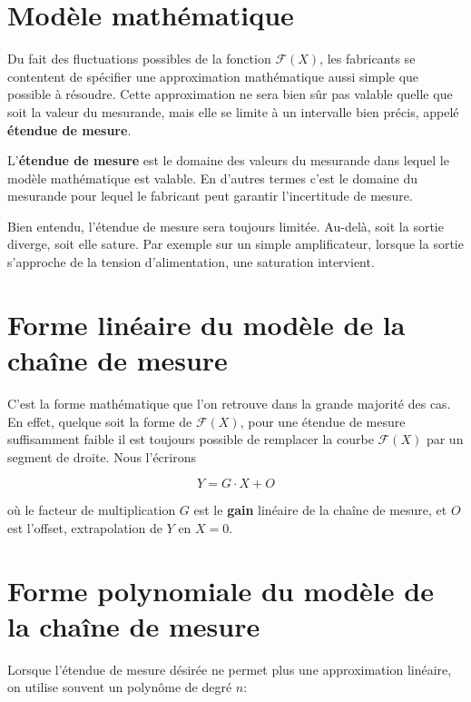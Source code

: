 \section{Modèle mathématique}

Du fait des fluctuations possibles de la fonction $\mathcal{F}(X)$, les fabricants se contentent de spécifier une approximation mathématique aussi simple que possible à résoudre. Cette approximation ne sera bien sûr pas valable quelle que soit la valeur du mesurande, mais elle se limite à un intervalle bien précis, appelé \textbf{étendue de mesure}.

\begin{definition}
    L'\textbf{étendue de mesure} est le domaine des valeurs du mesurande dans lequel le modèle mathématique est valable. En d'autres termes c'est le domaine du mesurande pour lequel le fabricant peut garantir l'incertitude de mesure.
\end{definition}

Bien entendu, l'étendue de mesure sera toujours limitée. Au-delà, soit la sortie diverge, soit elle sature. Par exemple sur un simple amplificateur, lorsque la sortie s'approche de la tension d'alimentation, une saturation intervient.

\section{Forme linéaire du modèle de la chaîne de mesure}

C'est la forme mathématique que l'on retrouve dans la grande majorité des cas. En effet, quelque soit la forme de $\mathcal{F}(X)$, pour une étendue de mesure suffisamment faible il est toujours possible de remplacer la courbe $\mathcal{F}(X)$ par un segment de droite. Nous l'écrirons

\begin{equation}
Y = G\cdot X + O
\end{equation}

où le facteur de multiplication $G$ est le \textbf{gain} linéaire de la chaîne de mesure, et $O$ est l'offset, extrapolation de $Y$ en $X=0$.

\section{Forme polynomiale du modèle de la chaîne de mesure}

Lorsque l'étendue de mesure désirée ne permet plus une approximation linéaire, on utilise souvent un polynôme de degré $n$:

